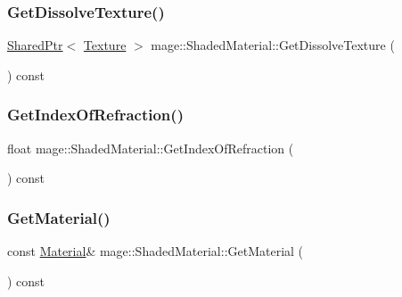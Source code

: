 \hypertarget{structmage_1_1_shaded_material_a442e7331e699f4b21f59e289272a361a}{}\label{structmage_1_1_shaded_material_a442e7331e699f4b21f59e289272a361a} 
\subsubsection{\texorpdfstring{Get\+Dissolve\+Texture()}{GetDissolveTexture()}}
{\footnotesize\ttfamily \hyperlink{namespacemage_a1e01ae66713838a7a67d30e44c67703e}{Shared\+Ptr}$<$ \hyperlink{classmage_1_1_texture}{Texture} $>$ mage\+::\+Shaded\+Material\+::\+Get\+Dissolve\+Texture (\begin{DoxyParamCaption}{ }\end{DoxyParamCaption}) const\hspace{0.3cm}{\ttfamily [noexcept]}}

\hypertarget{structmage_1_1_shaded_material_a4078cfbed3a919214428ab01d991b589}{}\label{structmage_1_1_shaded_material_a4078cfbed3a919214428ab01d991b589} 
\subsubsection{\texorpdfstring{Get\+Index\+Of\+Refraction()}{GetIndexOfRefraction()}}
{\footnotesize\ttfamily float mage\+::\+Shaded\+Material\+::\+Get\+Index\+Of\+Refraction (\begin{DoxyParamCaption}{ }\end{DoxyParamCaption}) const\hspace{0.3cm}{\ttfamily [noexcept]}}

\hypertarget{structmage_1_1_shaded_material_a4de9a6fe5389da19cbe3e5b073622374}{}\label{structmage_1_1_shaded_material_a4de9a6fe5389da19cbe3e5b073622374} 
\subsubsection{\texorpdfstring{Get\+Material()}{GetMaterial()}}
{\footnotesize\ttfamily const \hyperlink{structmage_1_1_material}{Material}\& mage\+::\+Shaded\+Material\+::\+Get\+Material (\begin{DoxyParamCaption}{ }\end{DoxyParamCaption}) const\hspace{0.3cm}{\ttfamily [noexcept]}}

